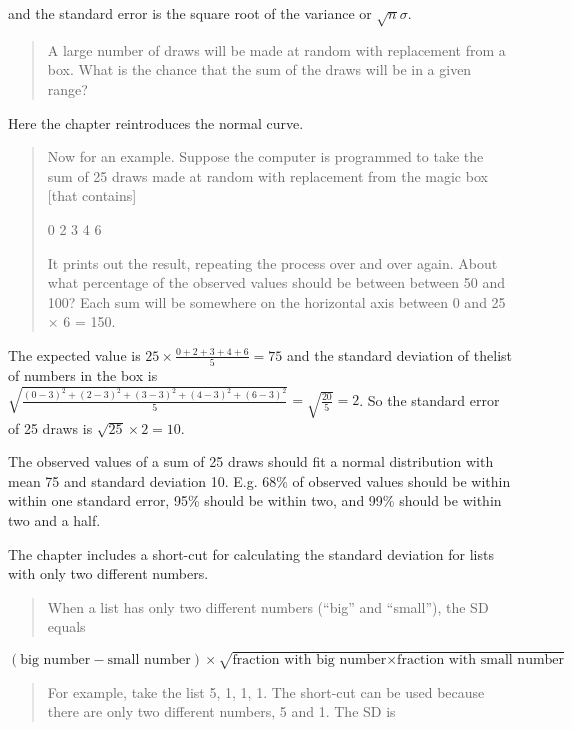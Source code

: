 \documentclass[
]{book}
\begin{document}
and the standard error is the square root of the variance or \(\sqrt{n}\sigma\).

\begin{quote}
A large number of draws will be made at random with replacement from a box. What is the chance that the sum of the draws will be in a given range?
\end{quote}

Here the chapter reintroduces the normal curve.

\begin{quote}
Now for an example. Suppose the computer is programmed to take the sum of 25 draws made at random with replacement from the magic box {[}that contains{]}

0 2 3 4 6

It prints out the result, repeating the process over and over again. About what percentage of the observed values should be between between 50 and 100? Each sum will be somewhere on the horizontal axis between 0 and 25 × 6 = 150.
\end{quote}

The expected value is \(25 \times \frac{0+2+3+4+6}{5} = 75\) and the standard deviation of thelist of numbers in the box is \(\sqrt{\frac{(0-3)^2 + (2-3)^2 + (3-3)^2 + (4-3)^2 + (6-3)^2}{5}} = \sqrt{\frac{20}{5}} = 2\). So the standard error of 25 draws is \(\sqrt{25} \times 2 = 10\).

The observed values of a sum of 25 draws should fit a normal distribution with mean 75 and standard deviation 10. E.g. 68\% of observed values should be within within one standard error, 95\% should be within two, and 99\% should be within two and a half.

The chapter includes a short-cut for calculating the standard deviation for lists with only two different numbers.

\begin{quote}
When a list has only two different numbers (``big'' and ``small''), the SD equals
\end{quote}

\[
\left( \text{big number} - \text{small number} \right) \times \sqrt{\text{fraction with big number} \times \text{fraction with small number}}
\]

\begin{quote}
For example, take the list 5, 1, 1, 1. The short-cut can be used because there are only two different numbers, 5 and 1. The SD is
\end{quote}
\end{document}
